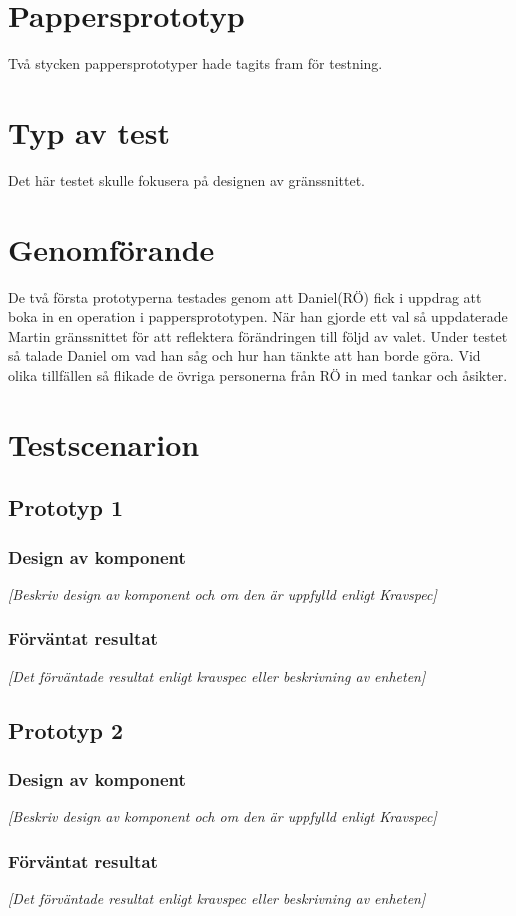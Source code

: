 \documentclass[a4paper,10pt]{article}
\begin{document}
\section{Pappersprototyp}
Två stycken pappersprototyper hade tagits fram för testning.
\section{Typ av test}
Det här testet skulle fokusera på designen av gränssnittet.
\section{Genomförande}
De två första prototyperna testades genom att Daniel(RÖ) fick i uppdrag att boka in en operation i pappersprototypen. När han gjorde ett val så uppdaterade Martin gränssnittet för att reflektera förändringen till följd av valet. Under testet så talade Daniel om vad han såg och hur han tänkte att han borde göra. Vid olika tillfällen så flikade de övriga personerna från RÖ in med tankar och åsikter.
\section{Testscenarion}

\subsection{Prototyp 1}
\subsubsection{Design av komponent}
\emph{[Beskriv design av komponent och om den är uppfylld enligt Kravspec]}
\subsubsection{Förväntat resultat}
\emph{[Det förväntade resultat enligt kravspec eller beskrivning av enheten]}
\subsection{Prototyp 2}
\subsubsection{Design av komponent}
\emph{[Beskriv design av komponent och om den är uppfylld enligt Kravspec]}
\subsubsection{Förväntat resultat}
\emph{[Det förväntade resultat enligt kravspec eller beskrivning av enheten]}
\end{document}
